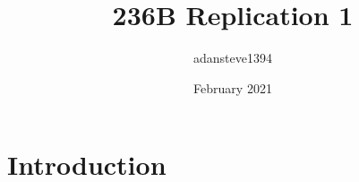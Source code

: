 \documentclass{article}
\title{236B Replication 1}
\author{adansteve1394 }
\date{February 2021}
\begin{document}
\maketitle

\section{Introduction}
\end{document}

